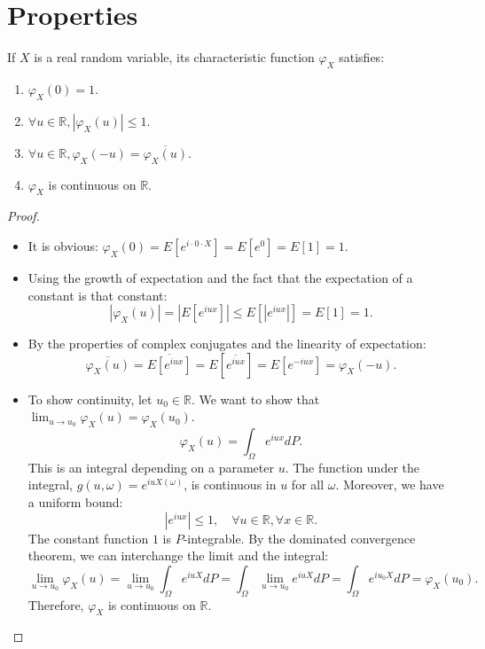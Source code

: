 \section{Properties}%
\begin{proposition}
If $X$ is a real random variable, its characteristic function $\varphi_X$ satisfies:
\begin{enumerate}
    \item[i)] $\varphi_X(0) = 1$.
    \item[ii)] $\forall u \in \mathbb{R}, |\varphi_X(u)| \le 1$.
    \item[iii)] $\forall u \in \mathbb{R}, \varphi_X(-u) = \overline{\varphi_X(u)}$.
    \item[iv)] $\varphi_X$ is continuous on $\mathbb{R}$.
\end{enumerate}
\end{proposition}%
\begin{proof}
\begin{itemize}
    \item[i)] It is obvious: $\varphi_X(0) = E[e^{i \cdot 0 \cdot X}] = E[e^0] = E[1] = 1$.
    \item[ii)] Using the growth of expectation and the fact that the expectation of a constant is that constant:
    \[ |\varphi_X(u)| = |E[e^{iux}]| \le E[|e^{iux}|] = E[1] = 1. \]
    \item[iii)] By the properties of complex conjugates and the linearity of expectation:
    \[ \overline{\varphi_X(u)} = \overline{E[e^{iux}]} = E[\overline{e^{iux}}] = E[e^{-iux}] = \varphi_X(-u). \]
    \item[iv)] To show continuity, let $u_0 \in \mathbb{R}$. We want to show that $\lim_{u \to u_0} \varphi_X(u) = \varphi_X(u_0)$.
    \[ \varphi_X(u) = \int_{\Omega} e^{iux} dP. \]
    This is an integral depending on a parameter $u$. The function under the integral, $g(u, \omega) = e^{iuX(\omega)}$, is continuous in $u$ for all $\omega$. Moreover, we have a uniform bound:
    \[ |e^{iux}| \le 1, \quad \forall u \in \mathbb{R}, \forall x \in \mathbb{R}. \]
    The constant function $1$ is $P$-integrable. By the dominated convergence theorem, we can interchange the limit and the integral:
    \[ \lim_{u \to u_0} \varphi_X(u) = \lim_{u \to u_0} \int_{\Omega} e^{iuX} dP = \int_{\Omega} \lim_{u \to u_0} e^{iuX} dP = \int_{\Omega} e^{iu_0X} dP = \varphi_X(u_0). \]
    Therefore, $\varphi_X$ is continuous on $\mathbb{R}$.
\end{itemize}
\end{proof}%

